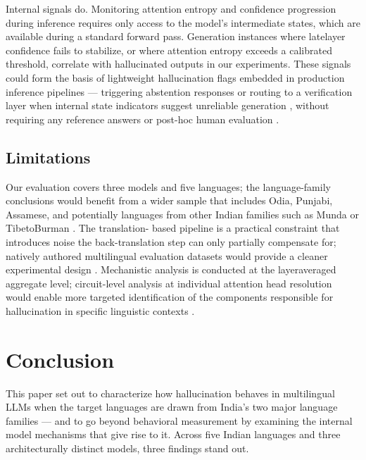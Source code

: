 \documentclass[conference]{IEEEtran}
\begin{document}
Internal signals do. Monitoring attention entropy and confidence progression during inference requires only access to
the model’s intermediate states, which are available during
a standard forward pass. Generation instances where latelayer confidence fails to stabilize, or where attention entropy
exceeds a calibrated threshold, correlate with hallucinated
outputs in our experiments. These signals could form the basis
of lightweight hallucination flags embedded in production inference pipelines — triggering abstention responses or routing
to a verification layer when internal state indicators suggest
unreliable generation \cite{b28}, without requiring any reference
answers or post-hoc human evaluation \cite{b23}.

\subsection{Limitations}

Our evaluation covers three models and five languages;
the language-family conclusions would benefit from a wider
sample that includes Odia, Punjabi, Assamese, and potentially
languages from other Indian families such as Munda or TibetoBurman \cite{b25}. The translation- based pipeline is a practical
constraint that introduces noise the back-translation step can
only partially compensate for; natively authored multilingual
evaluation datasets would provide a cleaner experimental
design \cite{b17}. Mechanistic analysis is conducted at the layeraveraged aggregate level; circuit-level analysis at individual
attention head resolution would enable more targeted identification of the components responsible for hallucination in
specific linguistic contexts \cite{b27}.


\section{Conclusion}

This paper set out to characterize how hallucination behaves
in multilingual LLMs when the target languages are drawn
from India’s two major language families — and to go beyond
behavioral measurement by examining the internal model
mechanisms that give rise to it. Across five Indian languages
and three architecturally distinct models, three findings stand
out.
\end{document}
